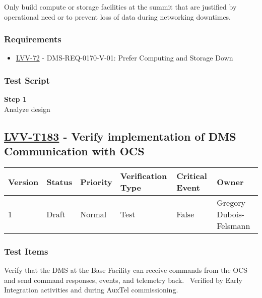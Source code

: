 Only build compute or storage facilities at the summit that are
justified by operational need or to prevent loss of data during
networking downtimes.

\subsubsection{Requirements}\label{requirements-41}

\begin{itemize}
\tightlist
\item
  \href{https://jira.lsstcorp.org/browse/LVV-72}{LVV-72} -
  DMS-REQ-0170-V-01: Prefer Computing and Storage Down
\end{itemize}

\subsubsection{Test Script}\label{test-script-41}

\textbf{Step 1}\\
Analyze design\\[2\baselineskip]

\hypertarget{lvv-t183---verify-implementation-of-dms-communication-with-ocs}{\subsection{\texorpdfstring{\href{https://jira.lsstcorp.org/secure/Tests.jspa\#/testCase/LVV-T183}{LVV-T183}
- Verify implementation of DMS Communication with
OCS}{LVV-T183 - Verify implementation of DMS Communication with OCS}}\label{lvv-t183---verify-implementation-of-dms-communication-with-ocs}}

\begin{longtable}[]{@{}llllll@{}}
\toprule
Version & Status & Priority & Verification Type & Critical Event &
Owner\tabularnewline
\midrule
\endhead
1 & Draft & Normal & Test & False & Gregory
Dubois-Felsmann\tabularnewline
\bottomrule
\end{longtable}

\subsubsection{Test Items}\label{test-items-42}

Verify that the DMS at the Base Facility can receive commands from the
OCS and send command responses, events, and telemetry back. ~Verified by
Early Integration activities and during AuxTel commissioning.

